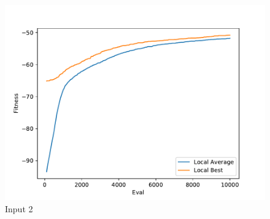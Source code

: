 \documentclass{standalone}
\begin{document}
\begin{figure}[!htb]
	\caption{Input 2}
	\label{fig:graph_2028}
	\includegraphics[width=\textwidth]{../graphs/graphs/2028.pdf}
\end{figure}
\end{document}
